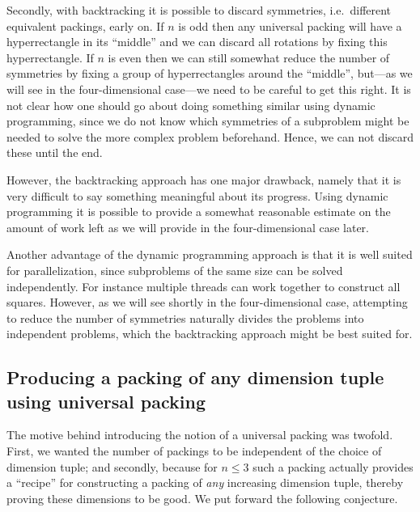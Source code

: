 Secondly, with backtracking it is possible to discard symmetries, i.e.\ different equivalent packings, early on. If $n$ is odd then any universal packing will have a hyperrectangle in its ``middle'' and we can discard all rotations by fixing this hyperrectangle. If $n$ is even then we can still somewhat reduce the number of symmetries by fixing a group of hyperrectangles around the ``middle'', but---as we will see in the four-dimensional case---we need to be careful to get this right. It is not clear how one should go about doing something similar using dynamic programming, since we do not know which symmetries of a subproblem might be needed to solve the more complex problem beforehand. Hence, we can not discard these until the end.

However, the backtracking approach has one major drawback, namely that it is very difficult to say something meaningful about its progress. Using dynamic programming it is possible to provide a somewhat reasonable estimate on the amount of work left as we will provide in the four-dimensional case later.

Another advantage of the dynamic programming approach is that it is well suited for parallelization, since subproblems of the same size can be solved independently. For instance multiple threads can work together to construct all squares. However, as we will see shortly in the four-dimensional case, attempting to reduce the number of symmetries naturally divides the problems into independent problems, which the backtracking approach might be best suited for.

\subsection{Producing a packing of any dimension tuple using universal packing}\label{sec:truely-universal-packing}
The motive behind introducing the notion of a universal packing was twofold. First, we wanted the number of packings to be independent of the choice of dimension tuple; and secondly, because for $n \leq 3$ such a packing actually provides a ``recipe'' for constructing a packing of \textit{any} increasing dimension tuple, thereby proving these dimensions to be good. We put forward the following conjecture.


